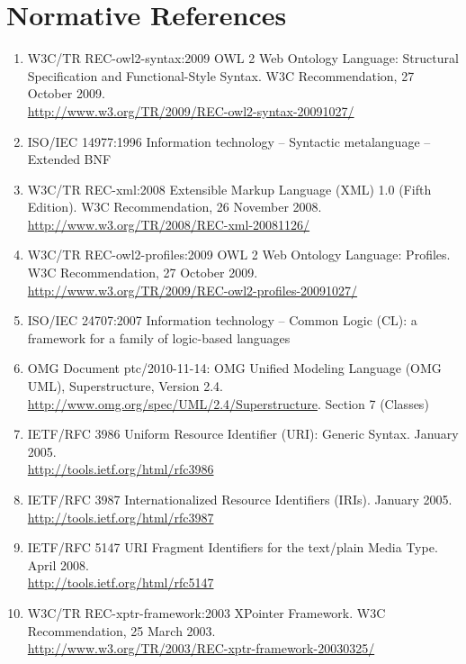 \documentclass[10pt,fleqn,%
\ifpretendfinal
final%
\else
draft%
\fi,
]{scrreprt}
\begin{document}
\chapter{Normative References}
\begin{enumerate}
  \item{W3C/TR REC-owl2-syntax:2009} {OWL 2 Web Ontology Language: Structural Specification and Functional-Style Syntax. W3C Recommendation, 27 October 2009.\\ \url{http://www.w3.org/TR/2009/REC-owl2-syntax-20091027/}}
  \item{ISO/IEC 14977:1996} {Information technology – Syntactic metalanguage – Extended BNF}
  \item{W3C/TR REC-xml:2008} {Extensible Markup Language (XML) 1.0 (Fifth Edition). W3C Recommendation, 26 November 2008. \\
  \url{http://www.w3.org/TR/2008/REC-xml-20081126/}}
  \item{W3C/TR REC-owl2-profiles:2009} {OWL 2 Web Ontology Language: Profiles. W3C Recommendation, 27 October 2009. \\
  \url{http://www.w3.org/TR/2009/REC-owl2-profiles-20091027/}}
  \item{ISO/IEC 24707:2007} {Information technology – Common Logic (CL): a framework for a family of logic-based languages}
  \item{OMG Document ptc/2010-11-14:} {OMG Unified Modeling Language (OMG UML), Superstructure, Version 2.4. \\
  \url{http://www.omg.org/spec/UML/2.4/Superstructure}. Section 7 (Classes)}
  \item{IETF/RFC 3986} {Uniform Resource Identifier (URI): Generic Syntax. January 2005.\\ \url{http://tools.ietf.org/html/rfc3986}}
  \item{IETF/RFC 3987} {Internationalized Resource Identifiers (IRIs). January 2005.\\ \url{http://tools.ietf.org/html/rfc3987}}
  \item{IETF/RFC 5147} {URI Fragment Identifiers for the text/plain Media Type.  April 2008.\\ \url{http://tools.ietf.org/html/rfc5147}}
  \item{W3C/TR REC-xptr-framework:2003} {XPointer Framework.  W3C Recommendation, 25 March 2003. \\ \url{http://www.w3.org/TR/2003/REC-xptr-framework-20030325/}}

\end{enumerate}
\end{document}

